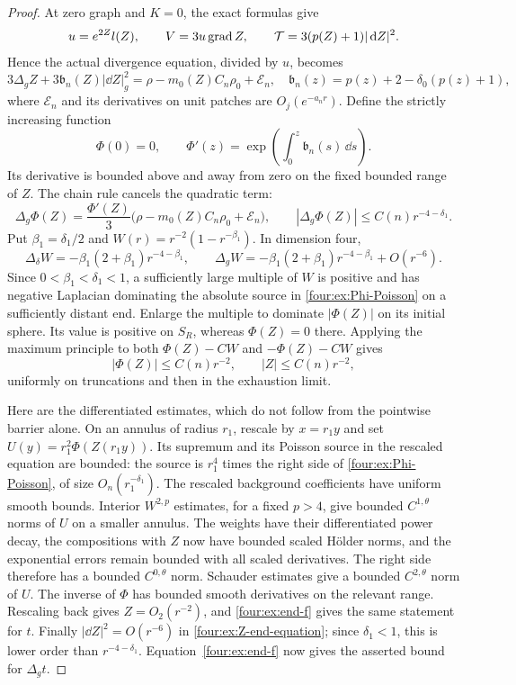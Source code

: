 \begin{proof}
At zero graph and $K=0$, the exact formulas give
\[
 u=e^{2Z}l(Z),\qquad V=3u\operatorname{grad} Z,
 \qquad \mathcal T=3(p(Z)+1)|\,\mathrm d Z|^2.
\]
Hence the actual divergence equation, divided by $u$, becomes
\begin{equation}\label{four:ex:Z-end-equation}
 3\Delta_gZ+3\mathfrak b_n(Z)|\dd Z|_g^2
 =\rho-m_0(Z)C_n\rho_0+\mathcal E_n,
 \quad \mathfrak b_n(z)=p(z)+2-\delta_0(p(z)+1),
\end{equation}
where $\mathcal E_n$ and its derivatives on unit patches are
$O_j(e^{-a_nr})$.  Define the strictly increasing function
\begin{equation}\label{four:ex:Phi}
 \Phi(0)=0,\qquad
 \Phi'(z)=\exp\left(\int_0^z \mathfrak b_n(s)\,\dd s\right).
\end{equation}
Its derivative is bounded above and away from zero on the fixed
bounded range of $Z$.  The chain rule cancels the quadratic term:
\begin{equation}\label{four:ex:Phi-Poisson}
 \Delta_g\Phi(Z)
 =\frac{\Phi'(Z)}3
    \bigl(\rho-m_0(Z)C_n\rho_0+\mathcal E_n\bigr),
 \qquad |\Delta_g\Phi(Z)|\le C(n)r^{-4-\delta_1}.
\end{equation}
Put $\beta_1=\delta_1/2$ and
$W(r)=r^{-2}(1-r^{-\beta_1})$.  In dimension four,
\[
 \Delta_\delta W=-\beta_1(2+\beta_1)r^{-4-\beta_1},
 \qquad
 \Delta_gW=-\beta_1(2+\beta_1)r^{-4-\beta_1}+O(r^{-6}).
\]
Since $0<\beta_1<\delta_1<1$, a sufficiently large multiple of $W$
is positive and has negative Laplacian dominating the absolute source
in \eqref{four:ex:Phi-Poisson} on a sufficiently distant end.  Enlarge the
multiple to dominate $|\Phi(Z)|$ on its initial sphere.  Its value is
positive on $S_R$, whereas $\Phi(Z)=0$ there.  Applying the maximum
principle to both $\Phi(Z)-CW$ and $-\Phi(Z)-CW$ gives
\[
 |\Phi(Z)|\le C(n)r^{-2},\qquad |Z|\le C(n)r^{-2},
\]
uniformly on truncations and then in the exhaustion limit.

Here are the differentiated estimates, which do not follow from the
pointwise barrier alone.  On an annulus of radius $r_1$, rescale by
$x=r_1y$ and set $U(y)=r_1^2\Phi(Z(r_1y))$.
Its supremum and its Poisson source in the rescaled equation are
bounded: the source is $r_1^4$ times the right side of
\eqref{four:ex:Phi-Poisson}, of size $O_n(r_1^{-\delta_1})$.
The rescaled background coefficients have uniform smooth bounds.
Interior $W^{2,p}$ estimates, for a fixed $p>4$, give bounded
$C^{1,\theta}$ norms of $U$ on a smaller annulus.  The weights have
their differentiated power decay, the compositions with $Z$ now
have bounded scaled H\"older norms, and the exponential errors remain
bounded with all scaled derivatives.  The right side therefore has a
bounded $C^{0,\theta}$ norm.  Schauder estimates give a bounded
$C^{2,\theta}$ norm of $U$.  The inverse of $\Phi$ has bounded smooth
derivatives on the relevant range.  Rescaling back gives
$Z=O_2(r^{-2})$, and \eqref{four:ex:end-f} gives the same statement for $t$.
Finally $|\dd Z|^2=O(r^{-6})$ in \eqref{four:ex:Z-end-equation}; since
$\delta_1<1$, this is lower order than $r^{-4-\delta_1}$.
Equation~\eqref{four:ex:end-f} now gives the asserted bound for $\Delta_gt$.
\end{proof}

